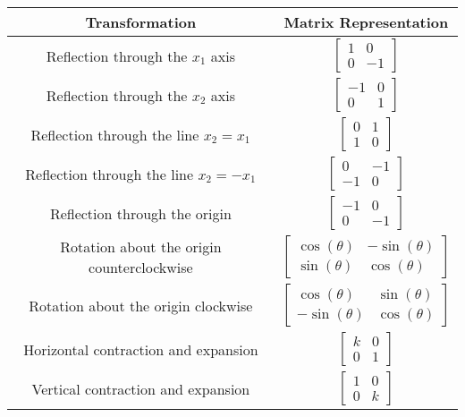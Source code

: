 \renewcommand{\arraystretch}{1.5}
\begin{longtable}{|c|c|}
  \toprule
  \textbf{Transformation} & \textbf{Matrix Representation} \\
  \midrule
  Reflection through the $x_1$ axis & $\begin{bmatrix} 1 & 0 \\ 0 & -1 \end{bmatrix}$ \\
  \midrule
  Reflection through the $x_2$ axis & $\begin{bmatrix} -1 & 0 \\ 0 & 1 \end{bmatrix}$ \\
  \midrule
  Reflection through the line $x_2 = x_1$ & $\begin{bmatrix} 0 & 1 \\ 1 & 0 \end{bmatrix}$ \\
  \midrule
  Reflection through the line $x_2 = -x_1$ & $\begin{bmatrix} 0 & -1 \\ -1 & 0 \end{bmatrix}$ \\
  \midrule
  Reflection through the origin & $\begin{bmatrix} -1 & 0 \\ 0 & -1 \end{bmatrix}$ \\
  \midrule
  Rotation about the origin counterclockwise & $\begin{bmatrix} \cos(\theta) & -\sin(\theta) \\ \sin(\theta) & \cos(\theta) \end{bmatrix}$ \\
  \midrule
  Rotation about the origin clockwise & $\begin{bmatrix} \cos(\theta) & \sin(\theta) \\ -\sin(\theta) & \cos(\theta) \end{bmatrix}$ \\
  \midrule
  Horizontal contraction and expansion & $\begin{bmatrix} k & 0 \\ 0 & 1 \end{bmatrix}$ \\
  \midrule
  Vertical contraction and expansion & $\begin{bmatrix} 1 & 0 \\ 0 & k \end{bmatrix}$ \\

\end{longtable}
